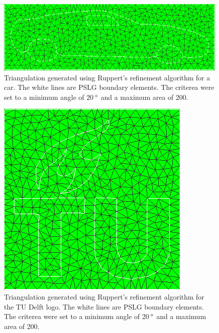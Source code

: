 \begin{figure}
    \centering
    \includegraphics[width=\columnwidth]{../images/Car_Ruppert20.png}
    \caption{Triangulation generated using Ruppert's refinement algorithm for a car. The white lines are PSLG boundary elements.
    The criterea were set to a minimum angle of 20$\,^{\circ}$ and a maximum area of 200.}
    \label{fig:result_Car20}
\end{figure}

\begin{figure}
    \centering
    \includegraphics[width=\columnwidth]{../images/TU_Ruppert20.png}
    \caption{Triangulation generated using Ruppert's refinement algorithm for the TU Delft logo. The white lines are PSLG boundary elements.
    The criterea were set to a minimum angle of 20$\,^{\circ}$ and a maximum area of 200.}
    \label{fig:result_TU20}
\end{figure}

